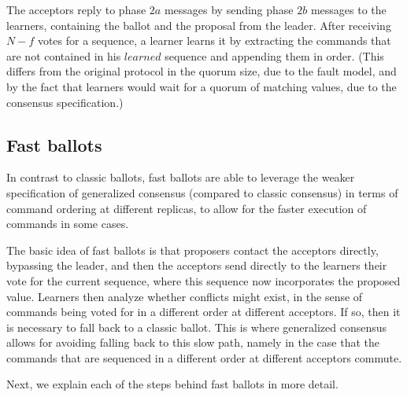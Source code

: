 The acceptors reply to phase $2a$ messages by sending phase $2b$ messages to the learners, containing the ballot and the proposal from the leader. After receiving $N-f$ votes for a sequence, a learner learns it by extracting the commands that are not contained in his $learned$ sequence and appending them in order. (This differs from the original protocol in the quorum size, due to the fault model, and by the fact that learners would wait for a quorum of matching values, due to the consensus specification.)

\subsection{Fast ballots} 

In contrast to classic ballots, fast ballots are able to leverage the weaker specification of generalized consensus (compared to classic consensus) in terms of command ordering at different replicas, to allow for the faster execution of commands in some cases.\par

The basic idea of fast ballots is that proposers contact the acceptors directly, bypassing the leader, and then the acceptors send directly to the learners their vote for the current sequence, where this
sequence now incorporates the proposed value. Learners then analyze whether conflicts might exist, in the sense of commands being voted for in a different order at different acceptors. If so, then it is
necessary to fall back to a classic ballot. This is where generalized consensus allows for avoiding falling back to this slow path, namely in the case that the commands that are sequenced in a different order at different acceptors commute.\par
Next, we explain each of the steps behind fast ballots in more detail.

